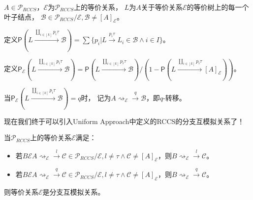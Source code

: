    \begin{definition}[$q$-转移($q$-transition)]
      $A\in \mathcal{P}_{RCCS}$，$\mathcal{E}$为$\mathcal{P}_{RCCS}$上的等价关系，
      $L$为$A$关于等价关系$\mathcal{E}$的等价树上的每一个叶子结点，
      $\mathcal{B}\in \mathcal{P}_{RCCS}/\mathcal{E}, \mathcal{B}\neq [A]_{\mathcal{E}}$。

      定义$\mathsf{P}(L\stackrel{\coprod_{i\in[k]}p_i\tau}{\longrightarrow}\mathcal{B})=\sum \{p_i|L\stackrel{p_i\tau}{\longrightarrow}L_i\in \mathcal{B}\wedge i\in I\}$。
      
      定义$\mathsf{P}_{\mathcal{E}}(L\stackrel{\coprod_{i\in[k]}p_i\tau}{\longrightarrow}\mathcal{B})=\mathsf{P}(L\stackrel{\coprod_{i\in[k]}p_i\tau}{\longrightarrow}\mathcal{B})/(1-\mathsf{P}(L\stackrel{\coprod_{i\in[k]}p_i\tau}{\longrightarrow}[A]_{\mathcal{E}}))$。

      当$\mathsf{P}_{\mathcal{E}}(L\stackrel{\coprod_{i\in[k]}p_i\tau}{\longrightarrow}\mathcal{B})=q$时，
      记为$A\rightsquigarrow_{\mathcal{E}}\stackrel{q}{\rightarrow}\mathcal{B}$，即$q$-转移。
   \end{definition}

   现在我们终于可以引入Uniform Approach中定义的RCCS的分支互模拟关系了！

   \begin{definition}
      当$\mathcal{P}_{RCCS}$上的等价关系$\mathcal{E}$满足：
      \begin{itemize}
         \item {
            若$B\mathcal{E}A\rightsquigarrow_{\mathcal{E}}\stackrel{l}{\rightarrow}\mathcal{C}\in \mathcal{P}_{RCCS}/\mathcal{E}, l\neq \tau \wedge \mathcal{C}\neq [A]_{\mathcal{E}}$，则$B\rightsquigarrow_{\mathcal{E}}\stackrel{l}{\rightarrow}\mathcal{C}$。
         }
         \item {
            若$B\mathcal{E}A\rightsquigarrow_{\mathcal{E}}\stackrel{q}{\rightarrow}\mathcal{C}\in \mathcal{P}_{RCCS}/\mathcal{E}, l\neq \tau \wedge \mathcal{C}\neq [A]_{\mathcal{E}}$，则$B\rightsquigarrow_{\mathcal{E}}\stackrel{q}{\rightarrow}\mathcal{C}$。
         }
      \end{itemize}
      则等价关系$\mathcal{E}$是分支互模拟关系。
   \end{definition}

